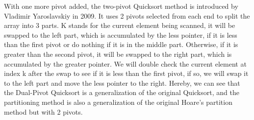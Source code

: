 \documentclass{article}
\begin{document}
With one more pivot added, the two-pivot Quicksort method is introduced by Vladimir Yaroslavskiy in 2009. It uses 2 pivots selected from each end to split the array into 3 parts.
K stands for the current element being scanned, it will be swapped to the left part, which is accumulated by the less pointer, if it is less than the first pivot or do nothing if it is in the middle part.
Otherwise, if it is greater than the second pivot, it will be swapped to the right part, which is accumulated by the greater pointer.
We will double check the current element at index k after the swap to see if it is less than the first pivot, if so, we will swap it to the left part and move the less pointer to the right.
Hereby, we can see that the Dual-Pivot Quicksort is a generalization of the original Quicksort, and the partitioning method is also a generalization of the original Hoare's partition method but with 2 pivots.
\end{document}
